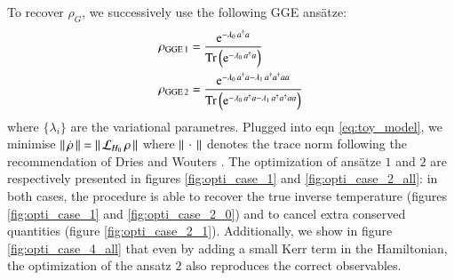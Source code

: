 To recover $\rho_G$, we successively use the following GGE ansätze:
\begin{align}
    \label{eq:ansatz_1}
    \rho_{\rm GGE \,1} &= \frac{{\rm e}^{- \lambda_0 \, a^\dag a }}{\mathrm{Tr}\left( {\rm e}^{- \lambda_0 \, a^\dag a } \right)} \\
    \label{eq:ansatz_2}
    \rho_{\rm GGE \,2} &= \frac{{\rm e}^{- \lambda_0 \, a^\dag a - \lambda_1 \,  a^\dag  a^\dag  a  a}}{\mathrm{Tr}\left( {\rm e}^{- \lambda_0 \, a^\dag a - \lambda_1 \,  a^\dag  a^\dag  a  a} \right)}
\end{align}
where $\{\lambda_i\}$ are the variational parametres. 
Plugged into eqn \ref{eq:toy_model}, we minimise $\vert\vert\, \dot \rho \,\vert\vert = \vert\vert\, \mathcal{L}_{H_0} \,\rho \,\vert\vert$ where $\vert\vert\, \cdot \,\vert\vert$ denotes the trace norm following the recommendation of Dries and Wouters \cite{sels2015stationary}.
The optimization of ansätze $1$ and $2$ are respectively presented in figures \ref{fig:opti_case_1} and \ref{fig:opti_case_2_all}: in both cases, the procedure is able to recover the true inverse temperature (figures \ref{fig:opti_case_1} and \ref{fig:opti_case_2_0}) and to cancel extra conserved quantities (figure \ref{fig:opti_case_2_1}). Additionally, we show in figure \ref{fig:opti_case_4_all} that even by adding a small Kerr term in the Hamiltonian, the optimization of the ansatz $2$ also reproduces the correct observables.
